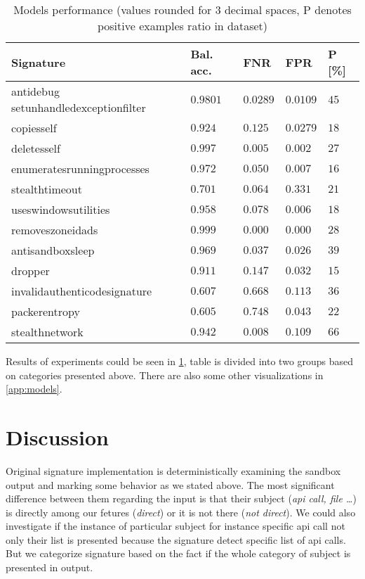 \begin{table}[h]
  \centering
  \caption{Models performance (values rounded for 3 decimal spaces, P denotes positive examples ratio in dataset)}
  \begin{tabular}{lllll}
      \toprule
      \textbf{Signature} &
      \textbf{Bal. acc.} &
      \textbf{FNR} &
      \textbf{FPR} &
      \textbf{P [\%]}
      \\
      \midrule
      antidebug setunhandledexceptionfilter & $0.9801$ & $0.0289$ & $0.0109$ & $45$ \\
      \midrule
      copiesself & $0.924$ & $0.125$ & $0.0279$ & $18$ \\
      \midrule
      deletesself & $0.997$ & $0.005$ & $0.002$ & $27$ \\
      \midrule
      enumeratesrunningprocesses & $0.972$ & $0.050$ & $0.007$ & $16$ \\
      \midrule
      stealthtimeout & $0.701$ & $0.064$ & $0.331$ & $21$ \\
      \midrule
      useswindowsutilities & $0.958$ & $0.078$ & $0.006$ & $18$ \\
      \midrule
      removeszoneidads & $0.999$ & $0.000$ & $0.000$ & $28$ \\
      \midrule[0.3pt]
      \midrule[0.3pt]
      antisandboxsleep & $0.969$ & $0.037$ & $0.026$ & $39$ \\
      \midrule
      dropper & $0.911$ & $0.147$ & $0.032$ & $15$ \\
      \midrule
      invalidauthenticodesignature & $0.607$ & $0.668$ & $0.113$ & $36$ \\
      \midrule
      packerentropy & $0.605$ & $0.748$ & $0.043$ & $22$ \\
      \midrule
      stealthnetwork & $0.942$ & $0.008$ & $0.109$ & $66$ \\
      \bottomrule
  \end{tabular}
  \label{tab:models_res}
\end{table}

Results of experiments could be seen in \ref{tab:models_res}, table is divided into two groups based on categories presented above. There are also some other visualizations in \ref{app:models}.

\section{Discussion}
Original signature implementation is deterministically examining the sandbox output and marking some behavior as we stated above. The most significant difference between them regarding the input is that their subject (\emph{api call, file \dots}) is directly among our fetures (\emph{direct}) or it is not there (\emph{not direct}). We could also investigate if the instance of particular subject for instance specific api call not only their list is presented because the signature detect specific list of api calls. But we categorize signature based on the fact if the whole category of subject is presented in output.

